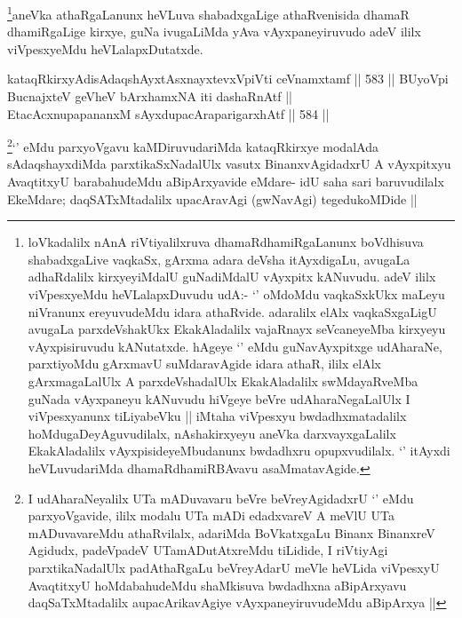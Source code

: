 \begin{artha}
\footnote{loVkadalilx nAnA riVtiyalilxruva dhamaRdhamiRgaLanunx boVdhisuva shabadxgaLive vaqkaSx, gArxma adara deVsha itAyxdigaLu, avugaLa adhaRdalilx kirxyeyiMdalU guNadiMdalU vAyxpitx kANuvudu. adeV ililx viVpesxyeMdu heVLalapxDuvudu udA:- `\stext' oMdoMdu vaqkaSxkUkx maLeyu niVranunx ereyuvudeMdu idara athaRvide. adaralilx elAlx vaqkaSxgaLigU avugaLa parxdeVshakUkx EkakAladalilx vajaRnayx seVcaneyeMba kirxyeyu vAyxpisiruvudu kANutatxde. hAgeye `\stext' eMdu guNavAyxpitxge udAharaNe, parxtiyoMdu gArxmavU suMdaravAgide idara athaR, ililx elAlx gArxmagaLalUlx A parxdeVshadalUlx EkakAladalilx swMdayaRveMba guNada vAyxpaneyu kANuvudu hiVgeye beVre udAharaNegaLalUlx I viVpesxyanunx tiLiyabeVku || iMtaha viVpesxyu bwdadhxmatadalilx hoMdugaDeyAguvudilalx, nAshakirxyeyu aneVka darxvayxgaLalilx EkakAladalilx vAyxpisideyeMbudanunx bwdadhxru opupxvudilalx. `\stext' itAyxdi heVLuvudariMda dhamaRdhamiRBAvavu asaMmatavAgide.}aneVka athaRgaLanunx heVLuva shabadxgaLige athaRvenisida dhamaR dhamiRgaLige kirxye, guNa ivugaLiMda yAva vAyxpaneyiruvudo adeV ililx viVpesxyeMdu heVLalapxDutatxde.
\end{artha}

				
\begin{shl}
kataqRkirxyAdisAdaqshAyxtAsx\s nayxtevxV\s piVti ceVnamxtamf ||  583 ||  
BUyoV\s pi BucnajxteV geVheV bArxhamxNA iti dashaRnAtf || \\
EtacAcxnupapananxM sAyxdupacAraparigarxhAtf ||  584 ||  
\end{shl}

\begin{artha}
\footnote{I udAharaNeyalilx UTa mADuvavaru beVre beVreyAgidadxrU `\stext' eMdu parxyoVgavide, ililx modalu UTa mADi edadxvareV A meVlU UTa mADuvavareMdu athaRvilalx, adariMda BoVkatxgaLu Binanx BinanxreV Agidudx, padeVpadeV UTamADutAtxreMdu tiLidide, I riVtiyAgi parxtikaNadalUlx padAthaRgaLu beVreyAdarU meVle heVLida viVpesxyU AvaqtitxyU hoMdabahudeMdu shaMkisuva bwdadhxna aBipArxyavu daqSaTxMtadalilx aupacArikavAgiye vAyxpaneyiruvudeMdu aBipArxya ||}`\stext' eMdu parxyoVgavu kaMDiruvudariMda kataqRkirxye modalAda sAdaqshayxdiMda parxtikaSxNadalUlx vasutx BinanxvAgidadxrU A vAyxpitxyu AvaqtitxyU barabahudeMdu aBipArxyavide eMdare- idU saha sari baruvudilalx EkeMdare; daqSATxMtadalilx upacAravAgi (gwNavAgi) tegedukoMDide ||
\end{artha}

